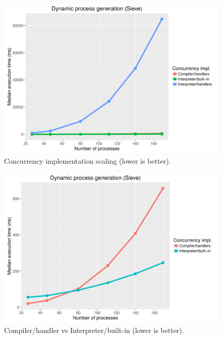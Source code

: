 \documentclass[12pt,mscres,cdtppar,twoside,openright,logo,rightchapter,normalheadings]{infthesis}
\theoremstyle{definition}
\begin{document}
\begin{figure}
\centering
\includegraphics[scale=0.55]{plots/sieve.pdf}
\caption{Concurrency implementation scaling (lower is better).}\label{fig:sieve-plot}
\end{figure}

\begin{figure}
\centering
\includegraphics[scale=0.55]{plots/sieve_compiler-interpreter.pdf}
\caption{Compiler/handler vs Interpreter/built-in (lower is better).}\label{fig:sieve-handler-interpreter-plot}
\end{figure}
\end{document}
